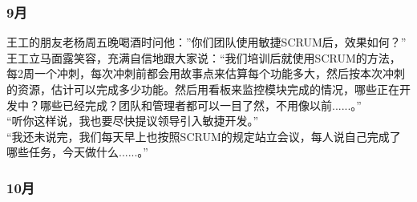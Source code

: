 \hypertarget{ux6708-2}{%
\subsubsection{9月}\label{ux6708-2}}

王工的朋友老杨周五晚喝酒时问他：”你们团队使用敏捷SCRUM后，效果如何？”\\
王工立马面露笑容，充满自信地跟大家说：“我们培训后就使用SCRUM的方法，每2周一个冲刺，每次冲刺前都会用故事点来估算每个功能多大，然后按本次冲刺的资源，估计可以完成多少功能。然后用看板来监控模块完成的情况，哪些正在开发中？哪些已经完成？团队和管理者都可以一目了然，不用像以前......。”\\
“听你这样说，我也要尽快提议领导引入敏捷开发。”\\
“我还未说完，我们每天早上也按照SCRUM的规定站立会议，每人说自己完成了哪些任务，今天做什么......。” 

\hypertarget{ux6708-3}{%
\subsubsection{10月}\label{ux6708-3}}

